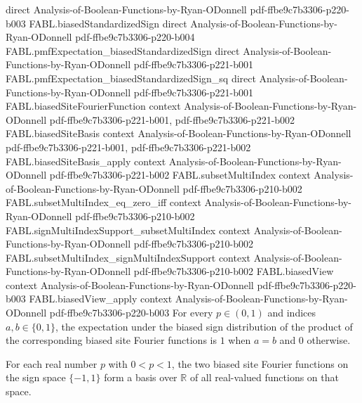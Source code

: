 \begin{theorem}
  {direct}
  {Analysis-of-Boolean-Functions-by-Ryan-ODonnell}
  {pdf-ffbe9c7b3306-p220-b003}
\proofstep
  {FABL.biasedStandardizedSign}
  {direct}
  {Analysis-of-Boolean-Functions-by-Ryan-ODonnell}
  {pdf-ffbe9c7b3306-p220-b004}
\proofstep
  {FABL.pmfExpectation_biasedStandardizedSign}
  {direct}
  {Analysis-of-Boolean-Functions-by-Ryan-ODonnell}
  {pdf-ffbe9c7b3306-p221-b001}
\proofstep
  {FABL.pmfExpectation_biasedStandardizedSign_sq}
  {direct}
  {Analysis-of-Boolean-Functions-by-Ryan-ODonnell}
  {pdf-ffbe9c7b3306-p221-b001}
\proofstep
  {FABL.biasedSiteFourierFunction}
  {context}
  {Analysis-of-Boolean-Functions-by-Ryan-ODonnell}
  {pdf-ffbe9c7b3306-p221-b001,
    pdf-ffbe9c7b3306-p221-b002}
\proofstep
  {FABL.biasedSiteBasis}
  {context}
  {Analysis-of-Boolean-Functions-by-Ryan-ODonnell}
  {pdf-ffbe9c7b3306-p221-b001,
    pdf-ffbe9c7b3306-p221-b002}
\proofstep
  {FABL.biasedSiteBasis_apply}
  {context}
  {Analysis-of-Boolean-Functions-by-Ryan-ODonnell}
  {pdf-ffbe9c7b3306-p221-b002}
\proofstep
  {FABL.subsetMultiIndex}
  {context}
  {Analysis-of-Boolean-Functions-by-Ryan-ODonnell}
  {pdf-ffbe9c7b3306-p210-b002}
\proofstep
  {FABL.subsetMultiIndex_eq_zero_iff}
  {context}
  {Analysis-of-Boolean-Functions-by-Ryan-ODonnell}
  {pdf-ffbe9c7b3306-p210-b002}
\proofstep
  {FABL.signMultiIndexSupport_subsetMultiIndex}
  {context}
  {Analysis-of-Boolean-Functions-by-Ryan-ODonnell}
  {pdf-ffbe9c7b3306-p210-b002}
\proofstep
  {FABL.subsetMultiIndex_signMultiIndexSupport}
  {context}
  {Analysis-of-Boolean-Functions-by-Ryan-ODonnell}
  {pdf-ffbe9c7b3306-p210-b002}
\proofstep
  {FABL.biasedView}
  {context}
  {Analysis-of-Boolean-Functions-by-Ryan-ODonnell}
  {pdf-ffbe9c7b3306-p220-b003}
\proofstep
  {FABL.biasedView_apply}
  {context}
  {Analysis-of-Boolean-Functions-by-Ryan-ODonnell}
  {pdf-ffbe9c7b3306-p220-b003}
For every $p\in(0,1)$ and indices $a,b\in\{0,1\}$, the expectation under the biased sign
distribution of the product of the corresponding biased site Fourier functions is $1$
when $a=b$ and $0$ otherwise.
\end{theorem}

\begin{definition}
\label{FABL.biasedSiteBasis}
\leanok
{}
For each real number $p$ with $0<p<1$, the two biased site Fourier functions on the sign
space $\{-1,1\}$ form a basis over $\mathbb{R}$ of all real-valued functions on that
space.
\end{definition}

